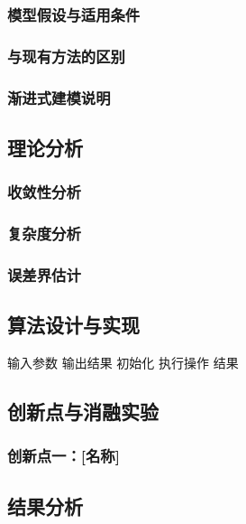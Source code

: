\documentclass[12pt,a4paper]{ctexart}
\begin{document}
\subsubsection{模型假设与适用条件}
\subsubsection{与现有方法的区别}
\subsubsection{渐进式建模说明}  %

\subsection{理论分析}  %
\subsubsection{收敛性分析}
\subsubsection{复杂度分析}
\subsubsection{误差界估计}

\subsection{算法设计与实现}
\begin{algorithm}[H]
\caption{算法名称}
\begin{algorithmic}[1]
\Require 输入参数
\Ensure 输出结果
\State 初始化
    \State 执行操作
\EndFor
\State \Return 结果
\end{algorithmic}
\end{algorithm}

\subsection{创新点与消融实验}  %
\subsubsection{创新点一：[名称]}  %

\subsection{结果分析}  %
\end{document}
